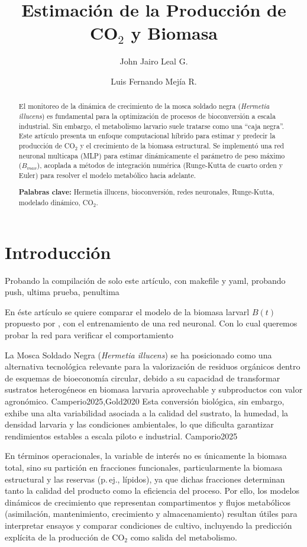 \documentclass[11pt,a4paper]{article}
\title{\textbf{Estimación de la Producción de CO$_2$ y Biomasa}}
\author{John Jairo Leal G. \and Luis Fernando Mejía R.}
\begin{document}
\maketitle

\begin{abstract}
El monitoreo de la dinámica de crecimiento de la mosca soldado negra (\textit{Hermetia illucens}) es fundamental para la optimización de procesos de bioconversión a escala industrial. Sin embargo, el metabolismo larvario suele tratarse como una ``caja negra''. Este artículo presenta un enfoque computacional híbrido para estimar y predecir la producción de CO$_2$ y el crecimiento de la biomasa estructural. Se implementó una red neuronal multicapa (MLP) para estimar dinámicamente el parámetro de peso máximo ($B_{max}$), acoplada a métodos de integración numérica (Runge-Kutta de cuarto orden y Euler) para resolver el modelo metabólico hacia adelante.

\textbf{Palabras clave:} Hermetia illucens, bioconversión, redes neuronales, Runge-Kutta, modelado dinámico, CO$_2$.
\end{abstract}

\section{Introducción}

Probando la compilación de solo este artículo, con makefile y yaml, probando push, ultima prueba, penultima


En éste artículo se quiere comparar el modelo de la biomasa larvarl $B(t)$ 
propuesto por \parencite{eriksenDynamicModellingFeed2022}, con el entrenamiento de una red neuronal. Con lo cual queremos probar la red para verificar el comportamiento

La Mosca Soldado Negra (\textit{Hermetia illucens}) se ha posicionado como una alternativa tecnológica relevante para la valorización de residuos orgánicos dentro de esquemas de bioeconomía circular, debido a su capacidad de transformar sustratos heterogéneos en biomasa larvaria aprovechable y subproductos con valor agronómico. Camperio2025,Gold2020 \cite{goldEffectsRearingSystem2022} Esta conversión biológica, sin embargo, exhibe una alta variabilidad asociada a la calidad del sustrato, la humedad, la densidad larvaria y las condiciones ambientales, lo que dificulta garantizar rendimientos estables a escala piloto e industrial. \cite{eriksenDynamicModellingFeed2022} Camporio2025

En términos operacionales, la variable de interés no es únicamente la biomasa total, sino su partición en fracciones funcionales, particularmente la biomasa estructural y las reservas (p.\,ej., lípidos), ya que dichas fracciones determinan tanto la calidad del producto como la eficiencia del proceso. \cite{eriksenDynamicModellingFeed2022} Por ello, los modelos dinámicos de crecimiento que representan compartimentos y flujos metabólicos (asimilación, mantenimiento, crecimiento y almacenamiento) resultan útiles para interpretar ensayos y comparar condiciones de cultivo, incluyendo la predicción explícita de la producción de CO$_2$ como salida del metabolismo. \cite{eriksenDynamicModellingFeed2022}
\end{document}
